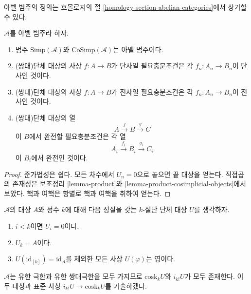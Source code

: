 \noindent
아벨 범주의 정의는 호몰로지의 절
\ref{homology-section-abelian-categories}에서 상기할 수 있다.

\begin{lemma}
\label{lemma-abelian}
$\mathcal{A}$를 아벨 범주라 하자.
\begin{enumerate}
\item 범주 $\text{Simp}(\mathcal{A})$와 $\text{CoSimp}(\mathcal{A})$는
아벨 범주이다.
\item (쌍대)단체 대상의 사상 $f : A \to B$가 단사일 필요충분조건은
각 $f_n : A_n \to B_n$이 단사인 것이다.
\item (쌍대)단체 대상의 사상 $f : A \to B$가 전사일 필요충분조건은
각 $f_n : A_n \to B_n$이 전사인 것이다.
\item (쌍대)단체 대상의 열
$$
A \xrightarrow{f} B \xrightarrow{g} C
$$
이 $B$에서 완전할 필요충분조건은 각 열
$$
A_i \xrightarrow{f_i} B_i \xrightarrow{g_i} C_i
$$
이 $B_i$에서 완전인 것이다.
\end{enumerate}
\end{lemma}

\begin{proof}
준가법성은 쉽다. 모든 차수에서 $U_n = 0$으로 놓으면 끝 대상을 얻는다.
직접곱의 존재성은 보조정리 \ref{lemma-product}와
\ref{lemma-product-cosimplicial-objects}에서 보았다. 핵과 여핵은 항별로
핵과 여핵을 취하여 얻는다.
\end{proof}

\noindent
$\mathcal{A}$의 대상 $A$와 정수 $k$에 대해 다음 성질을 갖는
$k$-절단 단체 대상 $U$를 생각하자.
\begin{enumerate}
\item $i < k$이면 $U_i = 0$이다.
\item $U_k = A$이다.
\item $U(\text{id}_{[k]}) = \text{id}_A$를 제외한 모든 사상
$U(\varphi)$는 영이다.
\end{enumerate}
$\mathcal{A}$는 유한 극한과 유한 쌍대극한을 모두 가지므로
$\text{cosk}_k U$와 $i_{k!}U$가 모두 존재한다. 이 두 대상과 표준 사상
$i_{k!}U \to \text{cosk}_kU$를 기술하겠다.


